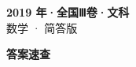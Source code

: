 \documentclass[zihao=-4, a4paper]{ctexart}
\begin{document}
\begin{center}
  {\Large\bfseries 2019 年·全国Ⅲ卷·文科}\\[4pt]
  {\large 数学 · 简答版}
\end{center}
\medskip
{}

\clearpage
{}
\begin{center}{\Large\bfseries 答案速查}\end{center}
\medskip

\end{document}
